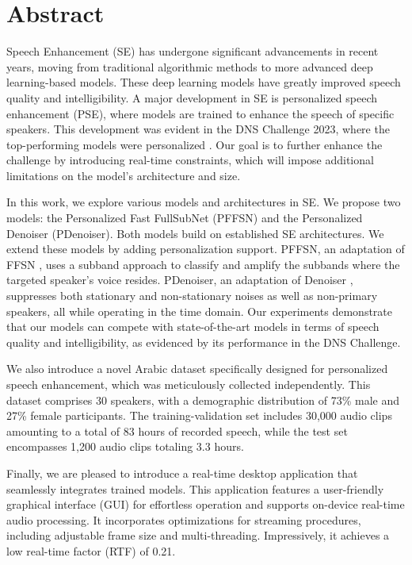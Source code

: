 \chapter*{Abstract}

Speech Enhancement (SE) has undergone significant advancements in recent years, moving from traditional algorithmic methods to more advanced deep learning-based models. These deep learning models have greatly improved speech quality and intelligibility.  A major development in SE is personalized speech enhancement (PSE),  where models are trained to enhance the speech of specific speakers. This development was evident in the DNS Challenge 2023, where the top-performing models were personalized \cite{dubey2023}. Our goal is to further enhance the challenge by introducing real-time constraints, which will impose additional limitations on the model's architecture and size.

In this work, we explore various models and architectures in SE. We propose two models: the Personalized Fast FullSubNet (PFFSN) and the Personalized Denoiser (PDenoiser). Both models build on established SE architectures. We extend these models by adding personalization support. PFFSN, an adaptation of FFSN \cite{hao2023fast}, uses a subband approach to classify and amplify the subbands where the targeted speaker's voice resides. PDenoiser, an adaptation of Denoiser \cite{defossez2020}, suppresses both stationary and non-stationary noises as well as non-primary speakers, all while operating in the time domain. Our experiments demonstrate that our models can compete with state-of-the-art models in terms of speech quality and intelligibility, as evidenced by its performance in the DNS Challenge.


We also introduce a novel Arabic dataset specifically designed for personalized speech enhancement, which was meticulously collected independently. This dataset comprises 30 speakers, with a demographic distribution of 73\% male and 27\% female participants. The training-validation set includes 30,000 audio clips amounting to a total of 83 hours of recorded speech, while the test set encompasses 1,200 audio clips totaling 3.3 hours.

Finally, we are pleased to introduce a real-time desktop application that seamlessly integrates trained models. This application features a user-friendly graphical interface (GUI) for effortless operation and supports on-device real-time audio processing. It incorporates optimizations for streaming procedures, including adjustable frame size and multi-threading. Impressively, it achieves a low real-time factor (RTF) of 0.21.